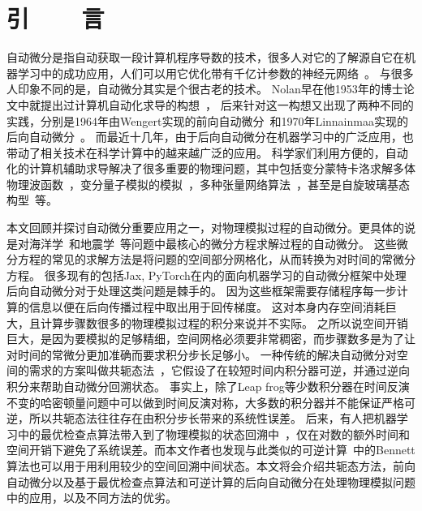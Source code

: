 \documentclass[A4,twoside,fontset=ubuntu,UTF8]{ctexart}
\begin{document}
\section{引~~~~言}
    自动微分是指自动获取一段计算机程序导数的技术，很多人对它的了解源自它在机器学习中的成功应用，人们可以用它优化带有千亿计参数的神经元网络~\cite{Rosset2019}。
与很多人印象不同的是，自动微分其实是个很古老的技术。
Nolan早在他1953年的博士论文中就提出过计算机自动化求导的构想~\cite{Nolan1953}，
后来针对这一构想又出现了两种不同的实践，分别是1964年由Wengert实现的前向自动微分~\cite{Wengert1964}和1970年Linnainmaa实现的后向自动微分~\cite{Linnainmaa1976}。
而最近十几年，由于后向自动微分在机器学习中的广泛应用，也带动了相关技术在科学计算中的越来越广泛的应用。
科学家们利用方便的，自动化的计算机辅助求导解决了很多重要的物理问题，其中包括变分蒙特卡洛求解多体物理波函数~\cite{Gutzwiller1963,Carleo2017, Deng2017,Cai2018}，变分量子模拟的模拟~\cite{Luo2019}，多种张量网络算法~\cite{Liao2019}，甚至是自旋玻璃基态构型~\cite{Liu2020}等。

本文回顾并探讨自动微分重要应用之一，对物理模拟过程的自动微分。更具体的说是对海洋学~\cite{Heimbach2005}和地震学~\cite{Symes2007,Zhu2020}等问题中最核心的微分方程求解过程的自动微分。
这些微分方程的常见的求解方法是将问题的空间部分网格化，从而转换为对时间的常微分方程。
很多现有的包括Jax, PyTorch在内的面向机器学习的自动微分框架中处理后向自动微分对于处理这类问题是棘手的。
因为这些框架需要存储程序每一步计算的信息以便在后向传播过程中取出用于回传梯度。
这对本身内存空间消耗巨大，且计算步骤数很多的物理模拟过程的积分来说并不实际。
之所以说空间开销巨大，是因为要模拟的足够精细，空间网格必须要非常稠密，而步骤数多是为了让对时间的常微分更加准确而要求积分步长足够小。
一种传统的解决自动微分对空间的需求的方案叫做共轭态法~\cite{Plessix2006,Chen2018}，它假设了在较短时间内积分器可逆，并通过逆向积分来帮助自动微分回溯状态。
事实上，除了Leap frog等少数积分器在时间反演不变的哈密顿量问题中可以做到时间反演对称，大多数的积分器并不能保证严格可逆，所以共轭态法往往存在由积分步长带来的系统性误差。
后来，有人把机器学习中的最优检查点算法带入到了物理模拟的状态回溯中~\cite{Symes2007}，仅在对数的额外时间和空间开销下避免了系统误差。而本文作者也发现与此类似的可逆计算~\cite{}中的Bennett算法也可以用于用利用较少的空间回溯中间状态。本文将会介绍共轭态方法，前向自动微分以及基于最优检查点算法和可逆计算的后向自动微分在处理物理模拟问题中的应用，以及不同方法的优劣。
\end{document}
